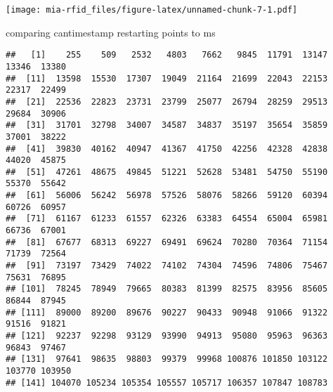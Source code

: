 \documentclass[
]{article}
\newenvironment{Shaded}{\begin{snugshade}}{\end{snugshade}}
\newcommand{\DecValTok}[1]{\textcolor[rgb]{0.00,0.00,0.81}{#1}}
\newcommand{\KeywordTok}[1]{\textcolor[rgb]{0.13,0.29,0.53}{\textbf{#1}}}
\newcommand{\NormalTok}[1]{#1}
\newcommand{\OperatorTok}[1]{\textcolor[rgb]{0.81,0.36,0.00}{\textbf{#1}}}
\newcommand{\StringTok}[1]{\textcolor[rgb]{0.31,0.60,0.02}{#1}}
\begin{document}
\texttt{[image: mia-rfid\_files/figure-latex/unnamed-chunk-7-1.pdf]}

comparing cantimestamp restarting points to ms

\begin{Shaded}
\end{Shaded}

\begin{verbatim}
##   [1]    255    509   2532   4803   7662   9845  11791  13147  13346  13380
##  [11]  13598  15530  17307  19049  21164  21699  22043  22153  22317  22499
##  [21]  22536  22823  23731  23799  25077  26794  28259  29513  29684  30906
##  [31]  31701  32798  34007  34587  34837  35197  35654  35859  37001  38222
##  [41]  39830  40162  40947  41367  41750  42256  42328  42838  44020  45875
##  [51]  47261  48675  49845  51221  52628  53481  54750  55190  55370  55642
##  [61]  56006  56242  56978  57526  58076  58266  59120  60394  60726  60957
##  [71]  61167  61233  61557  62326  63383  64554  65004  65981  66736  67001
##  [81]  67677  68313  69227  69491  69624  70280  70364  71154  71739  72564
##  [91]  73197  73429  74022  74102  74304  74596  74806  75467  75631  76895
## [101]  78245  78949  79665  80383  81399  82575  83956  85605  86844  87945
## [111]  89000  89200  89676  90227  90433  90948  91066  91322  91516  91821
## [121]  92237  92298  93129  93990  94913  95080  95963  96363  96843  97467
## [131]  97641  98635  98803  99379  99968 100876 101850 103122 103770 103950
## [141] 104070 105234 105354 105557 105717 106357 107847 108783
\end{verbatim}

\begin{Shaded}
\end{Shaded}
\end{document}
